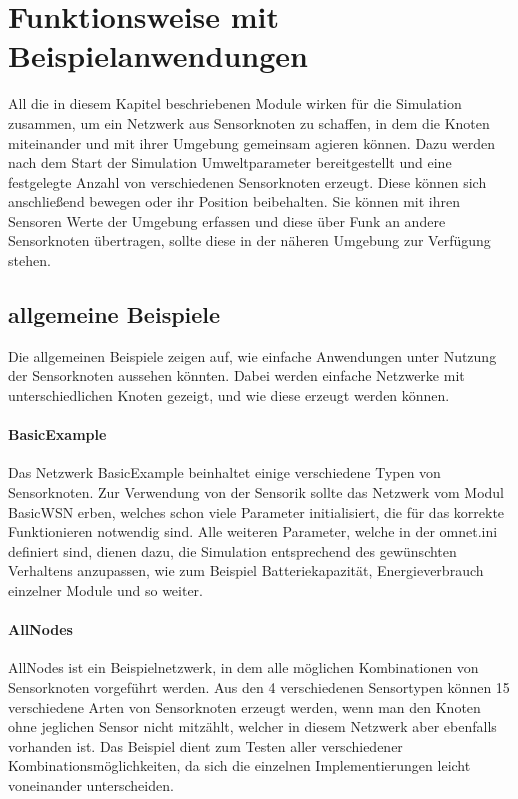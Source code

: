 \section{Funktionsweise mit Beispielanwendungen}

All die in diesem Kapitel beschriebenen Module wirken für die Simulation zusammen, um ein Netzwerk aus Sensorknoten zu schaffen, in dem die Knoten miteinander und mit ihrer Umgebung gemeinsam agieren können. Dazu werden nach dem Start der Simulation Umweltparameter bereitgestellt und eine festgelegte Anzahl von verschiedenen Sensorknoten erzeugt. Diese können sich anschließend bewegen oder ihr Position beibehalten. Sie können mit ihren Sensoren Werte der Umgebung erfassen und diese über Funk an andere Sensorknoten übertragen, sollte diese in der näheren Umgebung zur Verfügung stehen.

\subsection*{allgemeine Beispiele}

Die allgemeinen Beispiele zeigen auf, wie einfache Anwendungen unter Nutzung der Sensorknoten aussehen könnten. Dabei werden einfache Netzwerke mit unterschiedlichen Knoten gezeigt, und wie diese erzeugt werden können.

\paragraph{BasicExample}

Das Netzwerk BasicExample beinhaltet einige verschiedene Typen von Sensorknoten. Zur Verwendung von der Sensorik sollte das Netzwerk vom Modul BasicWSN erben, welches schon viele Parameter initialisiert, die für das korrekte Funktionieren notwendig sind. Alle weiteren Parameter, welche in der omnet.ini definiert sind, dienen dazu, die Simulation entsprechend des gewünschten Verhaltens anzupassen, wie zum Beispiel Batteriekapazität, Energieverbrauch einzelner Module und so weiter.

\paragraph{AllNodes}

AllNodes ist ein Beispielnetzwerk, in dem alle möglichen Kombinationen von Sensorknoten vorgeführt werden. Aus den 4 verschiedenen Sensortypen können 15 verschiedene Arten von Sensorknoten erzeugt werden, wenn man den Knoten ohne jeglichen Sensor nicht mitzählt, welcher in diesem Netzwerk aber ebenfalls vorhanden ist. Das Beispiel dient zum Testen aller verschiedener Kombinationsmöglichkeiten, da sich die einzelnen Implementierungen leicht voneinander unterscheiden.

